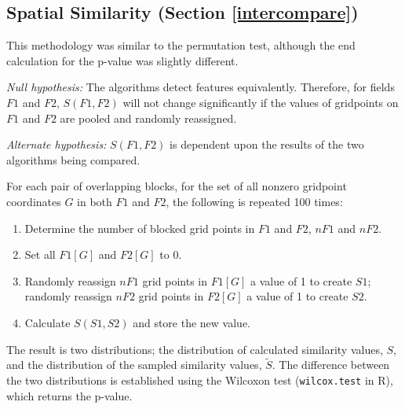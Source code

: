 \documentclass[smallextended]{svjour3}       %
\numberwithin{equation}{section}
\begin{document}
\begin{appendices}
\subsection{Spatial Similarity (Section \ref{intercompare})}

This methodology was similar to the permutation test, although the end calculation for the p-value was slightly different. 

\textit{Null hypothesis:} The algorithms detect features equivalently. Therefore, for fields $F1$ and $F2$, $S(F1,F2)$ will not change significantly if the values of gridpoints on $F1$ and $F2$ are pooled and randomly reassigned.

\noindent\textit{Alternate hypothesis:} $S(F1,F2)$ is dependent upon the results of the two algorithms being compared.

For each pair of overlapping blocks, for the set of all nonzero gridpoint coordinates $G$ in both $F1$ and $F2$, the following is repeated 100 times:
\begin{enumerate}
    \item Determine the number of blocked grid points in $F1$ and $F2$, $nF1$ and $nF2$.
    \item Set all $F1[G]$ and $F2[G]$ to 0.
    \item Randomly reassign $nF1$ grid points in $F1[G]$ a value of 1 to create $S1$; randomly reassign $nF2$ grid points in $F2[G]$ a value of 1 to create $S2$.
    \item Calculate $S(S1,S2)$ and store the new value.
\end{enumerate}

The result is two distributions; the distribution of calculated similarity values, $S$, and the distribution of the sampled similarity values, $\widetilde{S}$. The difference between the two distributions is established using the Wilcoxon test (\texttt{wilcox.test} in R), which returns the p-value.
\vfill


\end{appendices}


\pagebreak
\end{document}
